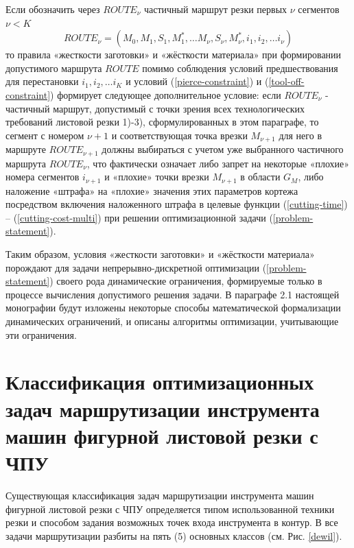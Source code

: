 \documentclass[12pt]{report}
\newcounter{lem}
\begin{document}
Если обозначить через
$ROUTE_\nu$
частичный маршрут резки первых $\nu$
сегментов
$\nu < K$
\begin{equation}
  ROUTE_\nu = (M_0, M_1, S_1, M_1^*, \dots M_\nu, S_\nu, M_\nu^*, i_1, i_2, \dots i_\nu)
\end{equation}
то правила «жесткости заготовки» и «жёсткости материала»
при формировании допустимого маршрута
$ROUTE$
помимо соблюдения условий предшествования для перестановки
$i_1, i_2, \dots i_K$
и условий (\ref{pierce-constraint}) и (\ref{tool-off-constraint})
формирует следующее дополнительное условие:
если
$ROUTE_\nu$ - частичный маршрут,
допустимый с точки зрения всех технологических
требований листовой резки 1)-3),
сформулированных в этом параграфе,
то сегмент с номером $\nu+1$
и соответствующая точка врезки $M_{\nu+1}$
для него в маршруте
$ROUTE_{\nu+1}$
должны выбираться с учетом уже выбранного частичного маршрута
$ROUTE_\nu$,
что фактически означает либо запрет
на некоторые «плохие» номера сегментов
$i_{\nu+1}$
и «плохие» точки врезки
$M_{\nu+1}$
в области  $G_M$,
либо наложение «штрафа» на «плохие» значения
этих параметров кортежа
посредством включения наложенного штрафа в целевые функции
(\ref{cutting-time}) – (\ref{cutting-cost-multi})
при решении оптимизационной задачи (\ref{problem-statement}).

Таким образом,
условия «жесткости заготовки» и «жёсткости материала»
порождают для задачи непрерывно-дискретной оптимизации (\ref{problem-statement})
своего рода динамические ограничения,
формируемые только в процессе вычисления допустимого решения задачи.
В параграфе 2.1
настоящей монографии будут изложены
некоторые способы математической формализации динамических ограничений,
и описаны алгоритмы оптимизации,
учитывающие эти ограничения.





\section{Классификация оптимизационных задач маршрутизации инструмента машин фигурной листовой резки с ЧПУ}

Существующая  классификация задач маршрутизации инструмента
машин фигурной листовой резки с ЧПУ определяется
типом использованной техники резки и способом задания
возможных точек входа инструмента в контур.
В \cite{intro13}
все задачи маршрутизации разбиты на пять (5) основных классов
(см. Рис. \ref{dewil}).
\end{document}
